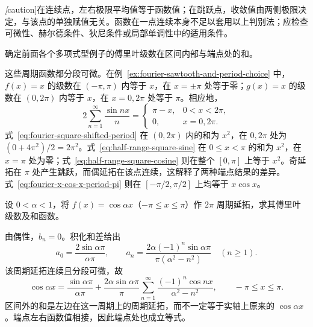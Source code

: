 \emph[caution]{在连续点，左右极限平均值等于函数值；在跳跃点，收敛值由两侧极限决定，与该点的单独赋值无关。}函数在一点连续本身不足以套用以上判别法；应检查可微性、赫尔德条件、狄尼条件或局部单调性中的适用条件。

\begin{example}
\label{ex:fourier-endpoint-sums}
确定前面各个多项式型例子的傅里叶级数在区间内部与端点处的和。
\end{example}

\begin{solve}
这些周期函数都分段可微。在例~\ref{ex:fourier-sawtooth-and-period-choice} 中，$f(x)=x$ 的级数在 $(-\pi,\pi)$ 内等于 $x$，在 $x=\pm\pi$ 处等于零；$g(x)=x$ 的级数在 $(0,2\pi)$ 内等于 $x$，在 $x=0,2\pi$ 处等于 $\pi$。相应地，
\begin{equation}
    2\sum_{n=1}^\infty\frac{\sin nx}{n}
      =\begin{cases}\pi-x,&0<x<2\pi,\\0,&x=0,2\pi.\end{cases}
    \label{eq:fourier-pi-minus-x-sum}
\end{equation}
式~\eqref{eq:fourier-square-shifted-period} 在 $(0,2\pi)$ 内的和为 $x^2$，在 $0,2\pi$ 处为 $(0+4\pi^2)/2=2\pi^2$。式~\eqref{eq:half-range-square-sine} 在 $0\leq x<\pi$ 的和为 $x^2$，在 $x=\pi$ 处为零；式~\eqref{eq:half-range-square-cosine} 则在整个 $[0,\pi]$ 上等于 $x^2$。奇延拓在 $\pi$ 处产生跳跃，而偶延拓在该点连续，这解释了两种端点结果的差异。式~\eqref{eq:fourier-x-cos-x-period-pi} 则在 $[-\pi/2,\pi/2]$ 上均等于 $x\cos x$。
\end{solve}

\begin{example}
\label{ex:fourier-cos-noninteger-frequency}
设 $0<\alpha<1$，将 $f(x)=\cos\alpha x$（$-\pi\leq x\leq\pi$）作 $2\pi$ 周期延拓，求其傅里叶级数及和函数。
\end{example}

\begin{solve}
由偶性，$b_n=0$。积化和差给出
\[
    a_0=\frac{2\sin\alpha\pi}{\alpha\pi},\qquad
    a_n=\frac{2\alpha(-1)^n\sin\alpha\pi}
                       {\pi(\alpha^2-n^2)}\quad(n\geq1).
\]
该周期延拓连续且分段可微，故
\begin{equation}
    \cos\alpha x=\frac{\sin\alpha\pi}{\alpha\pi}
       +\frac{2\alpha\sin\alpha\pi}{\pi}
          \sum_{n=1}^\infty
                    \frac{(-1)^n\cos nx}{\alpha^2-n^2},
    \qquad -\pi\leq x\leq\pi.
    \label{eq:fourier-cos-noninteger-frequency}
\end{equation}
区间外的和是左边在这一周期上的周期延拓，而不一定等于实轴上原来的 $\cos\alpha x$。端点左右函数值相接，因此端点处也成立等式。
\end{solve}


